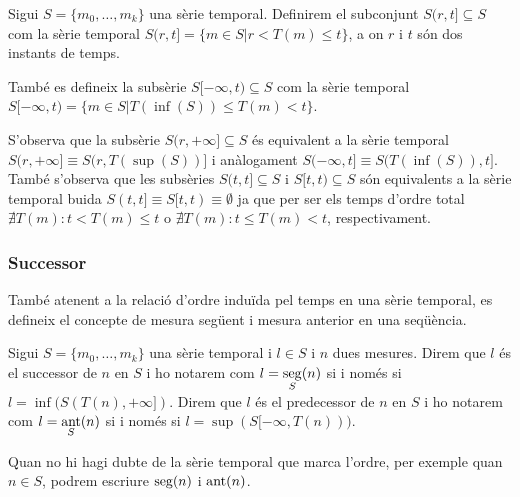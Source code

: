 
\begin{definition}[Interval]
  \label{def:model:st-interval}
  Sigui $S=\{m_0, \ldots, m_k\}$ una sèrie temporal. Definirem el subconjunt
  $S(r,t] \subseteq S$ com la sèrie temporal $S(r,t]=\{m\in S
  | r<T(m)\leq t\}$, a on $r$ i $t$ són dos instants de temps.

  També es defineix la subsèrie $S[-\infty,t)\subseteq S$ com la sèrie
  temporal $S[-\infty,t) = \{m\in S | T(\inf(S))\leq T(m) < t\}$.
\end{definition}
S'observa que la subsèrie $S(r,+\infty]\subseteq S$ és
equivalent a la sèrie temporal $S(r,+\infty] \equiv S(r,T(\sup(S))]$ i
anàlogament $S(-\infty,t] \equiv S(T(\inf(S)),t]$. També s'observa que les subsèries $S(t,t]\subseteq S$ i $S[t,t)\subseteq S$ són equivalents a la sèrie temporal buida $S(t,t] \equiv S[t,t) \equiv \emptyset$ ja que per ser els temps d'ordre total $\nexists T(m): t < T(m) \leq t$ o $\nexists T(m): t \leq T(m) < t$, respectivament. 




\subsubsection{Successor}


També atenent a la relació d'ordre induïda pel temps en una sèrie temporal, es
defineix el concepte de mesura següent i mesura anterior en una
seqüència.

\begin{definition}
  Sigui $S=\{m_0, \ldots, m_k\}$ una sèrie temporal i $l\in S$ i $n$ dues
  mesures. Direm que $l$ és el successor de $n$ en $S$ i ho notarem
  com $l=\operatorname*{seg}\limits_S(n)$ si i només si $l=\inf(S(T(n),+\infty])$.
  Direm que $l$ és el predecessor de $n$ en $S$ i ho notarem com
  $l=\operatorname*{ant}\limits_S(n)$ si i només si $l=\sup(S[-\infty,T(n)))$.

Quan no hi hagi dubte de la sèrie temporal que marca l'ordre, per
exemple quan $n\in S$, podrem escriure $\operatorname*{seg}(n)$ i $\operatorname*{ant}(n)$.
\end{definition}

